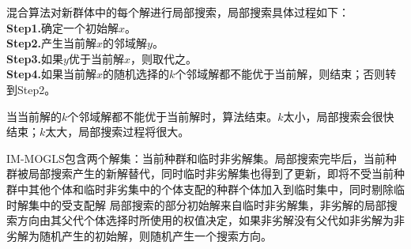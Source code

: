             \par
            混合算法对新群体中的每个解进行局部搜索，局部搜索具体过程如下：\\
            \textbf{Step1.}确定一个初始解$x$。\\
            \textbf{Step2.}产生当前解$x$的邻域解$y$。\\
            \textbf{Step3.}如果$y$优于当前解$x$，则取代之。\\
            \textbf{Step4.}如果当前解$x$的随机选择的$k$个邻域解都不能优于当前解，则结束；否则转到Step2。
            \par
            当当前解的$k$个邻域解都不能优于当前解时，算法结束。$k$太小，局部搜索会很快结束；$k$太大，局部搜索过程将很大。
            \par
            IM-MOGLS包含两个解集：当前种群和临时非劣解集。局部搜索完毕后，当前种群被局部搜索产生的新解替代，同时临时非劣解集也得到了更新，即将不受当前种群中其他个体和临时非劣集中的个体支配的种群个体加入到临时集中，同时剔除临时解集中的受支配解
            局部搜索的部分初始解来自临时非劣解集，非劣解的局部搜索方向由其父代个体选择时所使用的权值决定，如果非劣解没有父代如非劣解为非劣解为随机产生的初始解，则随机产生一个搜索方向。
